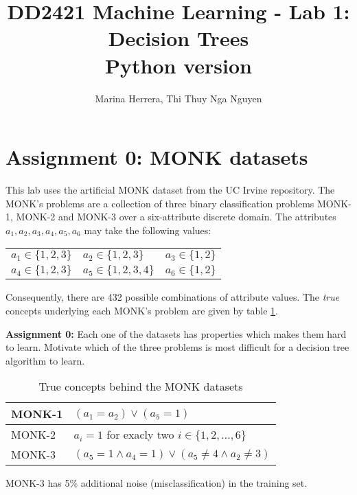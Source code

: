 \documentclass[11pt]{article}
\title{\vspace{-5.0cm}DD2421 Machine Learning - Lab 1: Decision Trees \\ Python version}
\author{Marina Herrera, Thi Thuy Nga Nguyen }
\date{}
\begin{document}
\maketitle


\section{Assignment 0: MONK datasets}

This lab uses the artificial MONK dataset from the UC Irvine repository.
The MONK's problems are a collection of three binary classification
problems MONK-1, MONK-2 and MONK-3 over a six-attribute discrete domain.
The attributes \(a_1, a_2, a_3, a_4, a_5, a_6\) may take the following values:

\begin{center}
  \begin{tabular}{lll}
    \(a_1 \in \{1, 2, 3\}\) &
    \(a_2 \in \{1, 2, 3\}\) &
    \(a_3 \in \{1, 2\}\)\\
    \(a_4 \in \{1, 2, 3\}\) &
    \(a_5 \in \{1, 2, 3, 4\}\) &
    \(a_6 \in \{1, 2\}\)\\
  \end{tabular}
\end{center}
Consequently, there are 432 possible combinations of attribute values. 
The \emph{true} concepts underlying each MONK's problem are given by
table \ref{tab:truemonk}.

\begin{tcolorbox}
\textbf{Assignment 0:}
Each one of the datasets has properties which makes them hard to learn.
Motivate which of the three problems is most difficult for a decision
tree algorithm to learn.
\end{tcolorbox}

\begin{table}
  \caption{True concepts behind the MONK datasets \label{tab:truemonk}}
  \begin{center}
    \begin{tabular}{|l|l|}
      \hline
      MONK-1 & \((a_1=a_2)\vee(a_5=1)\)\\
      \hline
      MONK-2 & \(a_i=1\) for exacly two \(i \in \{1, 2, \ldots, 6\}\)\\
      \hline
      MONK-3 & \((a_5=1 \wedge a_4=1) \vee (a_5\ne 4 \wedge a_2\ne 3)\)\\
      \hline
    \end{tabular}
  \end{center}
  MONK-3 has 5\% additional noise (misclassification) in the training set.
\end{table}
\end{document}
